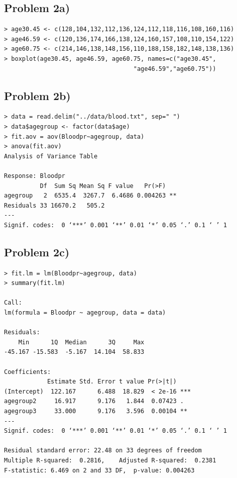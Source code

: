 \documentclass[a4paper, twocolumn]{article}
\begin{document}
\subsection*{Problem 2a)}
\begin{Verbatim}[fontsize=\footnotesize]
> age30.45 <- c(128,104,132,112,136,124,112,118,116,108,160,116)
> age46.59 <- c(120,136,174,166,138,124,160,157,108,110,154,122)
> age60.75 <- c(214,146,138,148,156,110,188,158,182,148,138,136)
> boxplot(age30.45, age46.59, age60.75, names=c("age30.45",
                                    "age46.59","age60.75"))

\end{Verbatim}

\subsection*{Problem 2b)}
\begin{Verbatim}[fontsize=\footnotesize]
> data = read.delim("../data/blood.txt", sep=" ")
> data$agegroup <- factor(data$age)
> fit.aov = aov(Bloodpr~agegroup, data)
> anova(fit.aov)
Analysis of Variance Table

Response: Bloodpr
          Df  Sum Sq Mean Sq F value   Pr(>F)   
agegroup   2  6535.4  3267.7  6.4686 0.004263 **
Residuals 33 16670.2   505.2                    
---
Signif. codes:  0 ‘***’ 0.001 ‘**’ 0.01 ‘*’ 0.05 ‘.’ 0.1 ‘ ’ 1                
\end{Verbatim}

\subsection*{Problem 2c)}
\begin{Verbatim}[fontsize=\footnotesize]
> fit.lm = lm(Bloodpr~agegroup, data)
> summary(fit.lm)

Call:
lm(formula = Bloodpr ~ agegroup, data = data)

Residuals:
    Min      1Q  Median      3Q     Max 
-45.167 -15.583  -5.167  14.104  58.833 

Coefficients:
            Estimate Std. Error t value Pr(>|t|)    
(Intercept)  122.167      6.488  18.829  < 2e-16 ***
agegroup2     16.917      9.176   1.844  0.07423 .  
agegroup3     33.000      9.176   3.596  0.00104 ** 
---
Signif. codes:  0 ‘***’ 0.001 ‘**’ 0.01 ‘*’ 0.05 ‘.’ 0.1 ‘ ’ 1

Residual standard error: 22.48 on 33 degrees of freedom
Multiple R-squared:  0.2816,	Adjusted R-squared:  0.2381 
F-statistic: 6.469 on 2 and 33 DF,  p-value: 0.004263

\end{Verbatim}
\end{document}
